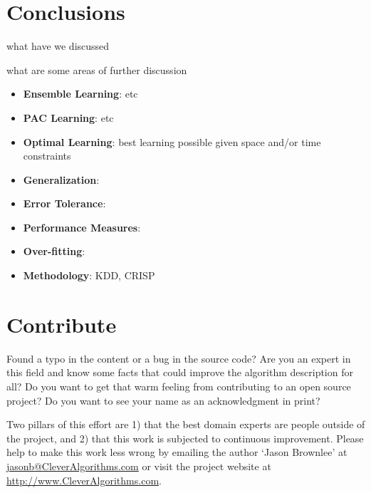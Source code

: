 \documentclass[a4paper, 11pt]{article}
\makeatletter
\newcommand{\myreportauthor}{Jason Brownlee}
\newcommand{\myreportemail}{jasonb@CleverAlgorithms.com}
\newcommand{\myreportwebsite}{http://www.CleverAlgorithms.com}
\makeatother
\begin{document}
\section{Conclusions}
\label{sec:conclusions}
what have we discussed


what are some areas of further discussion

\begin{itemize}
	\item \textbf{Ensemble Learning}: etc
	\item \textbf{PAC Learning}: etc
	\item \textbf{Optimal Learning}: best learning possible given space and/or time constraints
	\item \textbf{Generalization}:
	\item \textbf{Error Tolerance}:
	\item \textbf{Performance Measures}:
	\item \textbf{Over-fitting}:
	\item \textbf{Methodology}: KDD, CRISP
\end{itemize}



% 
% 
\section{Contribute}
\label{sec:contribute}
Found a typo in the content or a bug in the source code? 
Are you an expert in this field and know some facts that could improve the algorithm description for all?
Do you want to get that warm feeling from contributing to an open source project? 
Do you want to see your name as an acknowledgment in print?

Two pillars of this effort are 1) that the best domain experts are people outside of the project, and 2) that this work is subjected to continuous improvement. 
Please help to make this work less wrong by emailing the author `\myreportauthor' at \url{\myreportemail} or visit the project website at \url{\myreportwebsite}.



\end{document}
